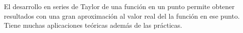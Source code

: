 
El desarrollo en series de Taylor de una funci\'on en un punto permite obtener resultados con una gran aproximaci\'on al valor real del la funci\'on en ese punto. Tiene muchas aplicaciones te\'oricas adem\'as de las pr\'acticas.
